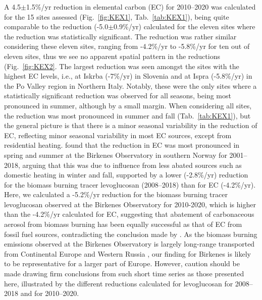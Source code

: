 A 4.5$\pm$1.5\%/yr reduction 
in elemental carbon (EC) for 2010--2020 was
calculated for the 15 sites assessed (Fig.~\ref{fig:KEX1}, Tab.~\ref{tab:KEX1}),
being quite comparable to the reduction (-5.0$\pm$0.9\%/yr)
calculated for the eleven sites where the reduction was statistically
significant. The reduction was rather similar considering these eleven
sites, ranging from -4.2\%/yr to -5.8\%/yr for ten out of eleven
sites, thus we see no apparent spatial pattern in the reductions
(Fig.~\ref{fig:KEX2}. The largest reduction was seen amongst the sites with the
highest EC levels, i.e., at Iskrba (-7\%/yr) in Slovenia and at Ispra
(-5.8\%/yr) in the Po Valley region in Northern Italy. Notably, these
were the only sites where a statistically significant reduction was
observed for all seasons, being most pronounced in summer, although
by a small margin. When considering all sites, the reduction was most
pronounced in summer and fall (Tab.~\ref{tab:KEX1}), but the general picture is
that there is a minor seasonal variability in the reduction of EC,
reflecting minor seasonal variability in most EC sources, except from
residential heating. \citet{Yttri2021} found that the reduction in EC
was most pronounced in spring and summer at the Birkenes Observatory in
southern Norway for 2001--2018, arguing that this was due to influence
from less abated sources such as domestic heating in winter and fall,
supported by a lower (-2.8\%/yr) reduction for the biomass burning
tracer levoglucosan (2008--2018) than for EC (-4.2\%/yr). Here,
we calculated a -5.2\%/yr reduction for the biomass burning tracer
levoglucosan observed at the Birkenes Observatory for 2010-2020, which is
higher than the -4.2\%/yr calculated for EC, suggesting that abatement
of carbonaceous aerosol from biomass burning has been equally successful
as that of EC from fossil fuel sources, contradicting the conclusion made
by \citet{Yttri2021} .   As the biomass burning emissions observed at the
Birkenes Observatory is largely long-range transported from Continental
Europe and Western Russia \citep{Yttri2021}, our finding for Birkenes
is likely to be representative for a larger part of Europe. However,
caution should be made drawing firm conclusions from such short time
series as those presented here, illustrated by the different reductions
calculated for levoglucosan for 2008--2018 and for 2010--2020.

